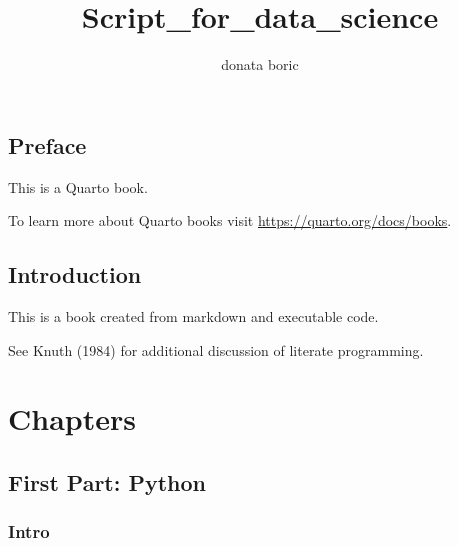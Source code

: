 \documentclass[
  letterpaper,
]{book}
\title{Script\_for\_data\_science}
\author{donata boric}
\date{}
\renewcommand*\contentsname{Table of contents}
\newcommand\contentsname{Table of contents}
\begin{document}
\frontmatter
\maketitle
\ifdefined\Shaded\renewenvironment{Shaded}{\begin{tcolorbox}[enhanced, boxrule=0pt, interior hidden, borderline west={3pt}{0pt}{shadecolor}, sharp corners, breakable, frame hidden]}{\end{tcolorbox}}\fi

\renewcommand*\contentsname{Table of contents}
{
\setcounter{tocdepth}{2}
\tableofcontents
}
\mainmatter
{}

\hypertarget{preface}{%
\chapter*{Preface}\label{preface}}


This is a Quarto book.

To learn more about Quarto books visit
\url{https://quarto.org/docs/books}.


\hypertarget{introduction}{%
\chapter*{Introduction}\label{introduction}}


This is a book created from markdown and executable code.

See Knuth (1984) for additional discussion of literate programming.

\part{Chapters}

\hypertarget{first-part-python}{%
\chapter{First Part: Python}\label{first-part-python}}

\hypertarget{intro}{%
\section{Intro}\label{intro}}
\end{document}

